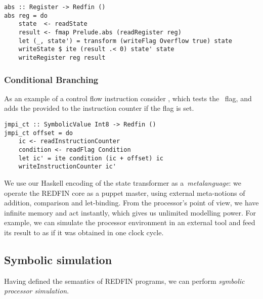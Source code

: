 \begin{verbatim}
abs :: Register -> Redfin ()
abs reg = do
    state  <- readState
    result <- fmap Prelude.abs (readRegister reg)
    let (_, state') = transform (writeFlag Overflow true) state
    writeState $ ite (result .< 0) state' state
    writeRegister reg result
\end{verbatim}


\subsubsection{Conditional Branching}
As an example of a control flow instruction consider , which
tests the~ flag, and adds the provided  to the
instruction counter if the flag is set.


\begin{verbatim}
jmpi_ct :: SymbolicValue Int8 -> Redfin ()
jmpi_ct offset = do
    ic <- readInstructionCounter
    condition <- readFlag Condition
    let ic' = ite condition (ic + offset) ic
    writeInstructionCounter ic'
\end{verbatim}


\noindent
We use our Haskell encoding of the state transformer as a~\emph{metalanguage}:
we operate the REDFIN core as a puppet master, using external meta-notions of
addition, comparison and let-binding. From the processor's
point of view, we have infinite memory and act instantly, which gives us unlimited
modelling power. For example, we can simulate the processor environment
in an external tool and feed its result to  as if it was
obtained in one clock cycle.

\subsection{Symbolic simulation}

Having defined the semantics of REDFIN programs, we can perform
\emph{symbolic processor simulation}.

